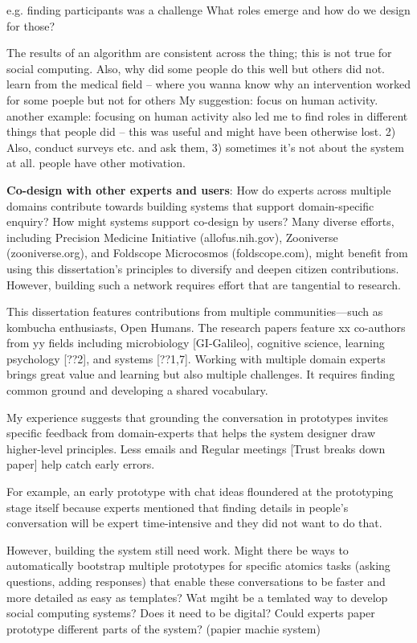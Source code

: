 e.g. finding participants was a challenge 
What roles emerge and how do we design for those?

The results of an algorithm are consistent across the thing; this is not true for social computing. 
Also, why did some people do this well but others did not. learn from the medical field -- where you wanna know why an intervention worked for some poeple but not for others
My suggestion: focus on human activity. another example: focusing on human activity also led me to find roles in different things that people did -- this was useful and might have been otherwise lost. 2) Also, conduct surveys etc. and ask them, 3) sometimes it's not about the system at all. people have other motivation.

\textbf{Co-design with other experts and users}: How do experts across multiple domains contribute towards building systems that support domain-specific enquiry? How might systems support co-design by users?
Many diverse efforts, including Precision Medicine Initiative (allofus.nih.gov), Zooniverse (zooniverse.org), and Foldscope Microcosmos (foldscope.com), might benefit from using this dissertation’s principles to diversify and deepen citizen contributions. However, building such a network requires effort that are tangential to research. 

This dissertation features contributions from multiple communities—such as kombucha enthusiasts, Open Humans. The research papers feature xx co-authors from yy fields including microbiology [GI-Galileo], cognitive science, learning psychology [??2], and systems [??1,7]. Working with multiple domain experts brings great value and learning but also multiple challenges. It requires finding common ground and developing a shared vocabulary. 

My experience suggests that grounding the conversation in prototypes invites specific feedback from domain-experts that helps the system designer draw higher-level principles. Less emails and Regular meetings [Trust breaks down paper] help catch early errors.

For example, an early prototype with chat ideas floundered at the prototyping stage itself because experts mentioned that finding details in people's conversation will be expert time-intensive and they did not want to do that. 

However, building the system still need work. Might there be ways to automatically bootstrap multiple prototypes for specific atomics tasks (asking questions, adding responses) that enable these conversations to be faster and more detailed as easy as templates? Wat mgiht be a temlated way to develop social computing systems? Does it need to be digital? Could experts paper prototype different parts of the system? (papier machie system)

